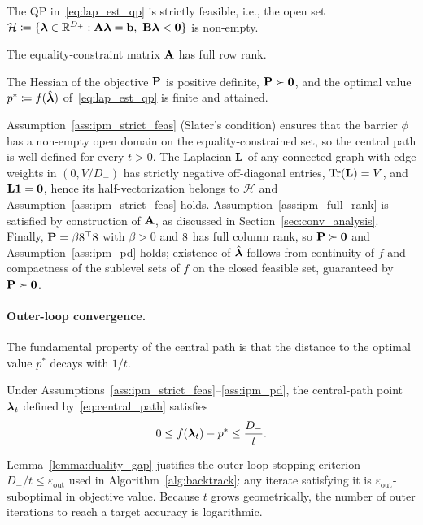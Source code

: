 \begin{assumption}\label{ass:ipm_strict_feas}
	The QP in~\eqref{eq:lap_est_qp} is strictly feasible, i.e., the open set $\mathcal{H}\coloneqq\{\lh\in\R^{D_+}: \A\lh=\b,\ \B\lh<\mathbf{0}\}$ is non-empty.
\end{assumption}
\begin{assumption}\label{ass:ipm_full_rank}
	The equality-constraint matrix $\A$ has full row rank.
\end{assumption}
\begin{assumption}\label{ass:ipm_pd}
	The Hessian of the objective $\P$ is positive definite, $\P\succ\mathbf{0}$, and the optimal value $p^\ast\coloneqq f(\hat{\lh})$ of~\eqref{eq:lap_est_qp} is finite and attained.
\end{assumption}
\noindent Assumption~\ref{ass:ipm_strict_feas} (Slater's condition) ensures that the barrier $\phi$ has a non-empty open domain on the equality-constrained set, so the central path is well-defined for every $t>0$. The Laplacian $\L$ of any connected graph with edge weights in $(0,V/D_-)$ has strictly negative off-diagonal entries, $\Tr(\L)=V$, and $\L\mathbf{1}=\mathbf{0}$, hence its half-vectorization belongs to $\mathcal{H}$ and Assumption~\ref{ass:ipm_strict_feas} holds. Assumption~\ref{ass:ipm_full_rank} is satisfied by construction of $\A$, as discussed in Section~\ref{sec:conv_analysis}. Finally, $\P=\beta\D^\top\D$ with $\beta>0$ and $\D$ has full column rank, so $\P\succ\mathbf{0}$ and Assumption~\ref{ass:ipm_pd} holds; existence of $\hat{\lh}$ follows from continuity of $f$ and compactness of the sublevel sets of $f$ on the closed feasible set, guaranteed by $\P\succ\mathbf{0}$.

\paragraph{Outer-loop convergence.} The fundamental property of the central path is that the distance to the optimal value $p^\ast$ decays with $1/t$.

\begin{lemma}\label{lemma:duality_gap}
	Under Assumptions~\ref{ass:ipm_strict_feas}--\ref{ass:ipm_pd}, the central-path point $\lh_t$ defined by~\eqref{eq:central_path} satisfies
	\begin{equation}\label{eq:duality_gap}
		0\leq f(\lh_t) - p^\ast \leq \frac{D_-}{t}.
	\end{equation}
\end{lemma}
Lemma~\ref{lemma:duality_gap} justifies the outer-loop stopping criterion $D_-/t\leq \varepsilon_\text{out}$ used in Algorithm~\ref{alg:backtrack}: any iterate satisfying it is $\varepsilon_\text{out}$-suboptimal in objective value. Because $t$ grows geometrically, the number of outer iterations to reach a target accuracy is logarithmic.

